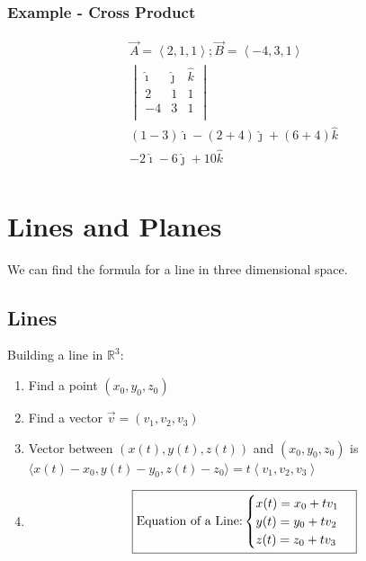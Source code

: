 \documentclass{article}
\newcommand{\nvec}[1]{\left\langle #1 \right\rangle}
\begin{document}
        \subsubsection{Example - Cross Product}
        \[
        \begin{aligned}
        \vec{A}=\nvec{2,1,1};\vec{B}=\nvec{-4,3,1}\\
        \begin{vmatrix}
        \hat{\imath} & \hat{\jmath} & \hat{k}\\
        2 & 1 & 1 \\
        -4 & 3 & 1\\
        \end{vmatrix}\\
        (1-3)\hat{\imath}-(2+4)\hat{\jmath}+(6+4)\hat{k}\\
        -2\hat{\imath}-6\hat{\jmath}+10\hat{k}\\
        \end{aligned}
        \]

\section{Lines and Planes}

    We can find the formula for a line in three dimensional space.\\

    \subsection{Lines}
    Building a line in $\mathbb{R}^3$:
    \begin{enumerate}
    \item Find a point $(x_0,y_0,z_0)$
    \item Find a vector $\vec{v}=(v_1,v_2,v_3)$
    \item Vector between $(x(t),y(t),z(t))$ and $(x_0,y_0,z_0)$ is $\langle x(t)-x_0,y(t)-y_0,z(t)-z_0\rangle = t\nvec{v_1,v_2,v_3}$
    \item \begin{equation}
    \boxed{\text{Equation of a Line:}\\
        \begin{cases}
            x(t)=x_0+tv_1\\
            y(t)=y_0+tv_2\\
            z(t)=z_0+tv_3
        \end{cases}}
    \end{equation}
    \end{enumerate}
\end{document}
